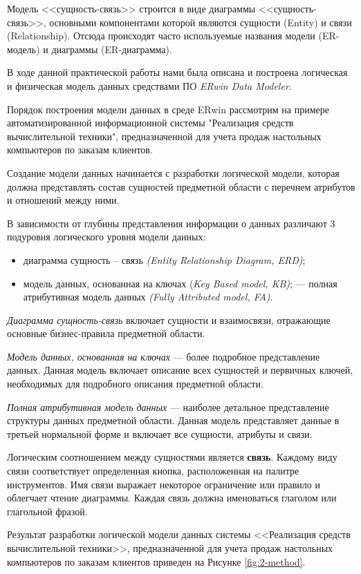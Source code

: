 \documentclass[a4paper,14pt]{extarticle}
\newcommand{\erdatamodaler}{\textit{ERwin Data Modeler}}
\begin{document}
Модель <<сущность-связь>> строится в виде диаграммы <<сущность-связь>>,
основными компонентами которой являются сущности (Entity) и связи (Relationship).
Отсюда происходят часто используемые названия модели (ER-модель) и диаграммы
(ER-диаграмма).

В ходе данной практической работы нами была описана и построена логическая и физическая модель данных средствами ПО \erdatamodaler.

Порядок построения модели данных в среде ERwin рассмотрим на примере
автоматизированной информационной системы "Реализация средств вычислительной
техники", предназначенной для учета продаж настольных компьютеров по заказам
клиентов.

Создание модели данных начинается с разработки логической модели, которая
должна представлять состав сущностей предметной области с перечнем атрибутов и
отношений между ними.

В зависимости от глубины представления информации о данных различают 3
подуровня логического уровня модели данных:
\begin{itemize}
	\item  диаграмма сущность – связь \textit{(Entity Relationship Diagram, ERD)};
	\item модель данных, основанная на ключах (\textit{Key Based model, KB)}; --- полная атрибутивная модель данных \textit{(Fully Attributed model, FA)}.
\end{itemize}

\textit{Диаграмма сущность-связь} включает сущности и взаимосвязи, отражающие
основные бизнес-правила предметной области.

\textit{Модель данных, основанная на ключах} --- более подробное представление данных.
Данная модель включает описание всех сущностей и первичных ключей,
необходимых для подробного описания предметной области.

\textit{Полная атрибутивная модель данных} --- наиболее детальное представление
структуры данных предметной области. Данная модель представляет данные в третьей
нормальной форме и включает все сущности, атрибуты и связи.

Логическим соотношением между сущностями является \textbf{связь}. Каждому виду
связи соответствует определенная кнопка, расположенная на палитре инструментов.
Имя связи выражает некоторое ограничение или правило и облегчает чтение
диаграммы. Каждая связь должна именоваться глаголом или глагольной фразой.

Результат разработки логической модели данных системы <<Реализация средств
вычислительной техники>>, предназначенной для учета продаж настольных
компьютеров по заказам клиентов приведен на Рисунке \ref{fig:2-method}.
\end{document}
